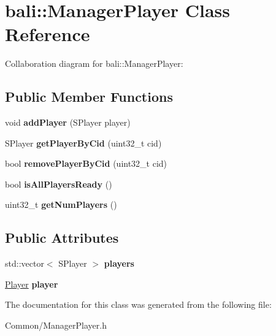 \hypertarget{classbali_1_1_manager_player}{\section{bali\-:\-:Manager\-Player Class Reference}
\label{classbali_1_1_manager_player}
}


Collaboration diagram for bali\-:\-:Manager\-Player\-:
\subsection*{Public Member Functions}
\begin{DoxyCompactItemize}
\item 
\hypertarget{classbali_1_1_manager_player_a3cc575da511aed9d10cd37623f31e39f}{void {\bfseries add\-Player} (S\-Player player)}\label{classbali_1_1_manager_player_a3cc575da511aed9d10cd37623f31e39f}

\item 
\hypertarget{classbali_1_1_manager_player_abf3100e85297f23f644acb4186ad9537}{S\-Player {\bfseries get\-Player\-By\-Cid} (uint32\-\_\-t cid)}\label{classbali_1_1_manager_player_abf3100e85297f23f644acb4186ad9537}

\item 
\hypertarget{classbali_1_1_manager_player_af36946a90c30e6205ecc7d3ee8de802e}{bool {\bfseries remove\-Player\-By\-Cid} (uint32\-\_\-t cid)}\label{classbali_1_1_manager_player_af36946a90c30e6205ecc7d3ee8de802e}

\item 
\hypertarget{classbali_1_1_manager_player_ac322ceacf995f6ff2c0c1e5458849001}{bool {\bfseries is\-All\-Players\-Ready} ()}\label{classbali_1_1_manager_player_ac322ceacf995f6ff2c0c1e5458849001}

\item 
\hypertarget{classbali_1_1_manager_player_aff1610e4b6bd6dcae9fae3643340adbe}{uint32\-\_\-t {\bfseries get\-Num\-Players} ()}\label{classbali_1_1_manager_player_aff1610e4b6bd6dcae9fae3643340adbe}

\end{DoxyCompactItemize}
\subsection*{Public Attributes}
\begin{DoxyCompactItemize}
\item 
\hypertarget{classbali_1_1_manager_player_a6d1f8592d3a111acf17a3d52f95ee491}{std\-::vector$<$ S\-Player $>$ {\bfseries players}}\label{classbali_1_1_manager_player_a6d1f8592d3a111acf17a3d52f95ee491}

\item 
\hypertarget{classbali_1_1_manager_player_ac2aa96274c616405f62ab47d806200c3}{\hyperlink{classbali_1_1_player}{Player} {\bfseries player}}\label{classbali_1_1_manager_player_ac2aa96274c616405f62ab47d806200c3}

\end{DoxyCompactItemize}


The documentation for this class was generated from the following file\-:\begin{DoxyCompactItemize}
\item 
Common/Manager\-Player.\-h\end{DoxyCompactItemize}

